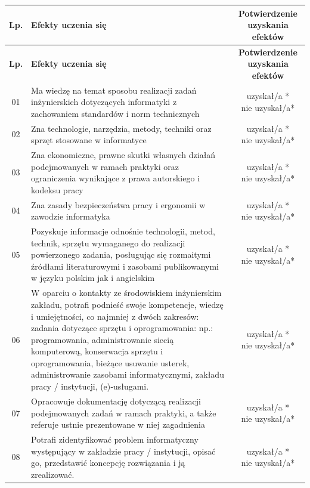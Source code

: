 \documentclass[11pt,a4paper]{article}
\begin{document}
\renewcommand{\arraystretch}{1.5}
\begin{longtable}{|c|p{11cm}|c|}
\hline
\textbf{Lp.} & \textbf{Efekty uczenia się} & \textbf{Potwierdzenie uzyskania efektów} \\ \hline
\endfirsthead
\hline
\textbf{Lp.} & \textbf{Efekty uczenia się} & \textbf{Potwierdzenie uzyskania efektów} \\ \hline
\endhead

01 & Ma wiedzę na temat sposobu realizacji zadań inżynierskich dotyczących informatyki z zachowaniem standardów i norm technicznych & \makecell{uzyskał/a *\\ nie uzyskał/a*} \\ \hline
02 & Zna technologie, narzędzia, metody, techniki oraz sprzęt stosowane w informatyce & \makecell{uzyskał/a *\\ nie uzyskał/a*} \\ \hline
03 & Zna ekonomiczne, prawne skutki własnych działań podejmowanych w ramach praktyki oraz ograniczenia wynikające z prawa autorskiego i kodeksu pracy & \makecell{uzyskał/a *\\ nie uzyskał/a*} \\ \hline
04 & Zna zasady bezpieczeństwa pracy i ergonomii w zawodzie informatyka & \makecell{uzyskał/a *\\ nie uzyskał/a*} \\ \hline
05 & Pozyskuje informacje odnośnie technologii, metod, technik, sprzętu wymaganego do realizacji powierzonego zadania, posługując się rozmaitymi źródłami literaturowymi i zasobami publikowanymi w języku polskim jak i angielskim & \makecell{uzyskał/a *\\ nie uzyskał/a*} \\ \hline
06 & W oparciu o kontakty ze środowiskiem inżynierskim zakładu, potrafi podnieść swoje kompetencje, wiedzę i umiejętności, co najmniej z dwóch zakresów: zadania dotyczące sprzętu i oprogramowania: np.: programowania, administrowanie siecią komputerową, konserwacja sprzętu i oprogramowania, bieżące usuwanie usterek, administrowanie zasobami informatycznymi, zakładu pracy / instytucji, (e)‑usługami. & \makecell{uzyskał/a *\\ nie uzyskał/a*} \\ \hline
07 & Opracowuje dokumentację dotyczącą realizacji podejmowanych zadań w ramach praktyki, a także referuje ustnie prezentowane w niej zagadnienia & \makecell{uzyskał/a *\\ nie uzyskał/a*} \\ \hline
08 & Potrafi zidentyfikować problem informatyczny występujący w zakładzie pracy / instytucji, opisać go, przedstawić koncepcję rozwiązania i ją zrealizować. & \makecell{uzyskał/a *\\ nie uzyskał/a*} \\ \hline

\end{longtable}
\end{document}
